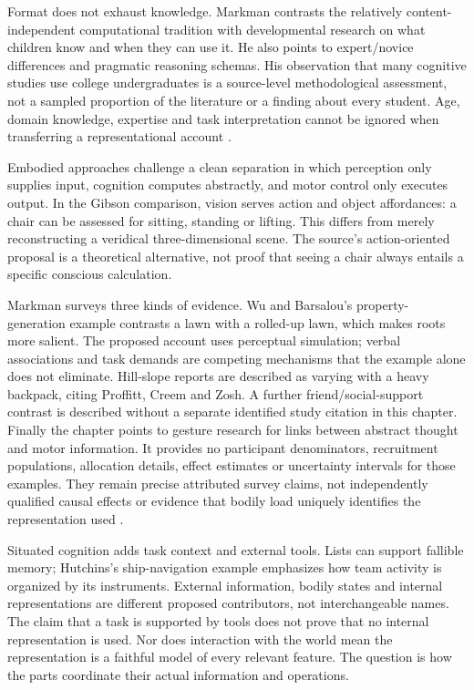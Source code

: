 Format does not exhaust knowledge. Markman contrasts the relatively
content-independent computational tradition with developmental
research on what children know and when they can use it. He
also points to expert/novice differences and pragmatic reasoning
schemas. His observation that many cognitive studies use college
undergraduates is a source-level methodological assessment, not
a sampled proportion of the literature or a finding about every
student. Age, domain knowledge, expertise and task interpretation
cannot be ignored when transferring a representational account
\cite[p.~47]{Markman2012CognitiveRepresentation}.

Embodied approaches challenge a clean separation in which perception
only supplies input, cognition computes abstractly, and motor control
only executes output. In the Gibson comparison, vision serves
action and object affordances: a chair can be assessed for sitting,
standing or lifting. This differs from merely reconstructing a
veridical three-dimensional scene. The source's action-oriented
proposal is a theoretical alternative, not proof that seeing a
chair always entails a specific conscious calculation.

Markman surveys three kinds of evidence. Wu and Barsalou's property-
generation example contrasts a lawn with a rolled-up lawn, which
makes roots more salient. The proposed account uses perceptual
simulation; verbal associations and task demands are competing
mechanisms that the example alone does not eliminate. Hill-slope
reports are described as varying with a heavy backpack, citing
Proffitt, Creem and Zosh. A further friend/social-support contrast
is described without a separate identified study citation in this
chapter. Finally the chapter points to gesture research for links
between abstract thought and motor information. It provides no
participant denominators, recruitment populations, allocation details,
effect estimates or uncertainty intervals for those examples.
They remain precise attributed survey claims, not independently
qualified causal effects or evidence that bodily load uniquely
identifies the representation used
\cite[pp.~47--48]{Markman2012CognitiveRepresentation}.

Situated cognition adds task context and external tools. Lists
can support fallible memory; Hutchins's ship-navigation example
emphasizes how team activity is organized by its instruments.
External information, bodily states and internal representations
are different proposed contributors, not interchangeable names.
The claim that a task is supported by tools does not prove that
no internal representation is used. Nor does interaction with the
world mean the representation is a faithful model of every relevant
feature. The question is how the parts coordinate their actual
information and operations.

